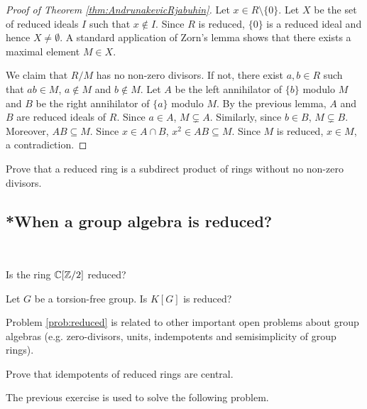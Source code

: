 \begin{proof}[Proof of Theorem \ref{thm:AndrunakevicRjabuhin}]
    Let $x\in R\setminus\{0\}$. Let $X$ 
    be the set of reduced ideals $I$ such that 
    $x\not\in I$. Since $R$ is reduced, $\{0\}$ 
    is a reduced ideal and hence $X\ne\emptyset$. 
    A standard application of Zorn's lemma shows that
    there exists a maximal element $M\in X$. 
    
    We claim that $R/M$ has no non-zero divisors. If not, 
    there exist $a,b\in R$ such that $ab\in M$, $a\not\in M$ 
    and $b\not\in M$. Let $A$ be the left annihilator of $\{b\}$ 
    modulo $M$ and $B$ be the right annihilator of $\{a\}$ 
    modulo $M$. By the previous lemma, $A$ and $B$ 
    are reduced ideals of $R$. Since  
    $a\in A$, $M\subsetneq A$. Similarly, since 
    $b\in B$, $M\subsetneq B$. Moreover, $AB\subseteq M$. 
    Since $x\in A\cap B$, $x^2\in AB\subseteq M$. Since 
    $M$ is reduced, $x\in M$, a contradiction. 
\end{proof}

\begin{exercise}
    Prove that a reduced ring is a subdirect product
    of rings without no non-zero divisors. 
\end{exercise}

\subsection{*When a group algebra is reduced?}
\
\begin{exercise}
    Is the ring $\mathbb{C}[\mathbb{Z}/2]$ reduced? 
\end{exercise}


\begin{problem}
\label{prob:reduced}
    Let $G$ be a torsion-free group. Is
    $K[G]$ is reduced?
\end{problem}

Problem \ref{prob:reduced} is related to other important
open problems about group algebras 
(e.g. zero-divisors, units, 
indempotents and semisimplicity of group
rings).

\begin{exercise}
\label{xca:reduced_central}
    Prove that idempotents of reduced rings are central. 
\end{exercise}

The previous exercise is used to solve the following problem.

